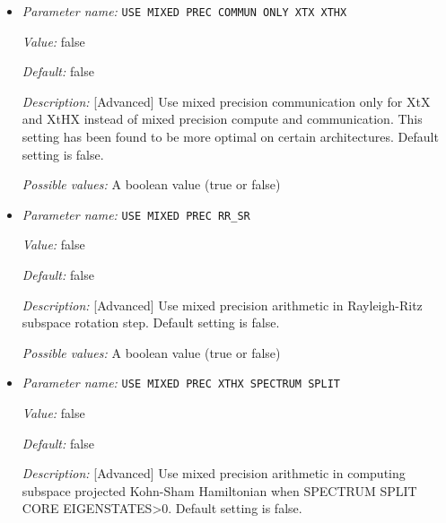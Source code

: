 \begin{itemize}
{\it Possible values:} A boolean value (true or false)
\item {\it Parameter name:} {\tt USE MIXED PREC COMMUN ONLY XTX XTHX}
\label{parameters:SCF parameters/Eigen_2dsolver parameters/USE MIXED PREC COMMUN ONLY XTX XTHX}
\label{parameters:SCF_20parameters/Eigen_2dsolver_20parameters/USE_20MIXED_20PREC_20COMMUN_20ONLY_20XTX_20XTHX}


{\it Value:} false


{\it Default:} false


{\it Description:} [Advanced] Use mixed precision communication only for XtX and XtHX instead of mixed precision compute and communication. This setting has been found to be more optimal on certain architectures. Default setting is false.


{\it Possible values:} A boolean value (true or false)
\item {\it Parameter name:} {\tt USE MIXED PREC RR\_SR}
\label{parameters:SCF parameters/Eigen_2dsolver parameters/USE MIXED PREC RR_5fSR}
\label{parameters:SCF_20parameters/Eigen_2dsolver_20parameters/USE_20MIXED_20PREC_20RR_5fSR}


{\it Value:} false


{\it Default:} false


{\it Description:} [Advanced] Use mixed precision arithmetic in Rayleigh-Ritz subspace rotation step. Default setting is false.


{\it Possible values:} A boolean value (true or false)
\item {\it Parameter name:} {\tt USE MIXED PREC XTHX SPECTRUM SPLIT}
\label{parameters:SCF parameters/Eigen_2dsolver parameters/USE MIXED PREC XTHX SPECTRUM SPLIT}
\label{parameters:SCF_20parameters/Eigen_2dsolver_20parameters/USE_20MIXED_20PREC_20XTHX_20SPECTRUM_20SPLIT}


{\it Value:} false


{\it Default:} false


{\it Description:} [Advanced] Use mixed precision arithmetic in computing subspace projected Kohn-Sham Hamiltonian when SPECTRUM SPLIT CORE EIGENSTATES>0.  Default setting is false.



\end{itemize}
